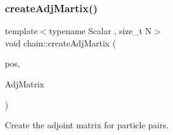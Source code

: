 \subsubsection{\texorpdfstring{create\+Adj\+Martix()}{createAdjMartix()}}
{\footnotesize\ttfamily template$<$typename Scalar , size\+\_\+t N$>$ \\
void chain\+::create\+Adj\+Martix (\begin{DoxyParamCaption}\item[{const \mbox{\hyperlink{namespacechain_aa715d2f046187ea9f0c3ea55605d6214}{Vector\+Array}}$<$ Scalar, N $>$ \&}]{pos,  }\item[{\mbox{\hyperlink{namespacechain_a3a021b84403e03113e1dcd61ba304963}{Node\+Array}}$<$ Scalar, N $\ast$(N -\/ 1)/2 $>$ \&}]{Adj\+Matrix }\end{DoxyParamCaption})}



Create the adjoint matrix for particle pairs. 


